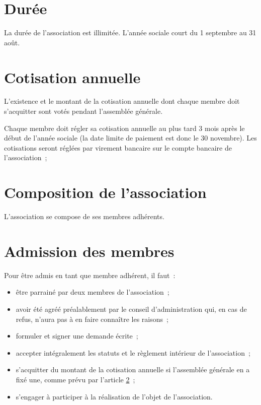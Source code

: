 \documentclass[12 pt]{article}
\begin{document}
\section{Durée}
\label{sec:duree}

La durée de l'association est illimitée. L'année sociale court du
1\ier{} septembre au 31 août.

\section{Cotisation annuelle}
\label{sec:cotisation-annuelle}

L'existence et le montant de la cotisation annuelle dont chaque membre
doit s'acquitter sont votés pendant l'assemblée générale.

Chaque membre doit régler sa cotisation annuelle au plus tard 3 mois
après le début de l'année sociale (la date limite de paiement est donc
le 30 novembre). Les cotisations seront réglées par virement bancaire
sur le compte bancaire de l'association~;

\section{Composition de l'association}
\label{sec:composition-de-l-association}

L'association se compose de ses membres adhérents.

\section{Admission des membres}
\label{sec:admission-des-membres}

Pour être admis en tant que membre adhérent, il faut~:

\begin{itemize}
\item être parrainé par deux membres de l'association~;
\item avoir été agréé préalablement par le conseil d'administration
  qui, en cas de refus, n'aura pas à en faire connaître les raisons~;
\item formuler et signer une demande écrite~;
\item accepter intégralement les statuts et le règlement intérieur de
  l'association~;
\item s'acquitter du montant de la cotisation annuelle si l'assemblée
  générale en a fixé une, comme prévu par l'article
  \ref{sec:cotisation-annuelle}~;
\item s'engager à participer à la réalisation de l'objet de
  l'association.
\end{itemize}
\end{document}
